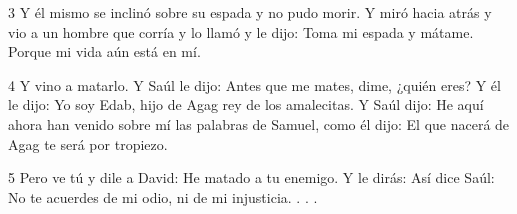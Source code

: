 \par 3 Y él mismo se inclinó sobre su espada y no pudo morir. Y miró hacia atrás y vio a un hombre que corría y lo llamó y le dijo: Toma mi espada y mátame. Porque mi vida aún está en mí.

\par 4 Y vino a matarlo. Y Saúl le dijo: Antes que me mates, dime, ¿quién eres? Y él le dijo: Yo soy Edab, hijo de Agag rey de los amalecitas. Y Saúl dijo: He aquí ahora han venido sobre mí las palabras de Samuel, como él dijo: El que nacerá de Agag te será por tropiezo.

\par 5 Pero ve tú y dile a David: He matado a tu enemigo. Y le dirás: Así dice Saúl: No te acuerdes de mi odio, ni de mi injusticia. . . .



